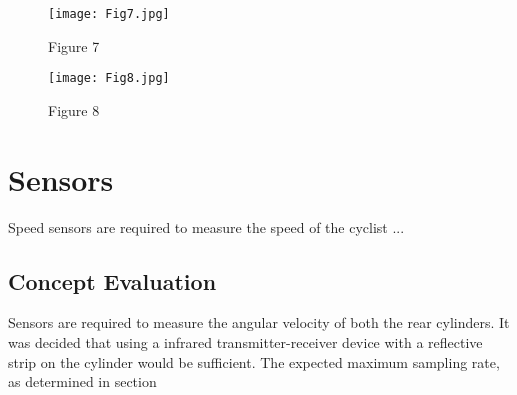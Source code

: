 \begin{figure}[H]
	\begin{center}
		\texttt{[image: Fig7.jpg]}
		\caption{Figure 7}
		\label{fig:7}
	\end{center}
\end{figure}
\begin{figure}[H]
	\begin{center}
		\texttt{[image: Fig8.jpg]}
		\caption{Figure 8}
		\label{fig:8}
	\end{center}
\end{figure}

\newpage
\section{Sensors}
Speed sensors are required to measure the speed of the cyclist ...
\subsection{Concept Evaluation}
Sensors are required to measure the angular velocity of both the rear cylinders. It was decided that using a infrared transmitter-receiver device with a reflective strip on the cylinder would be sufficient. The expected maximum sampling rate, as determined in section